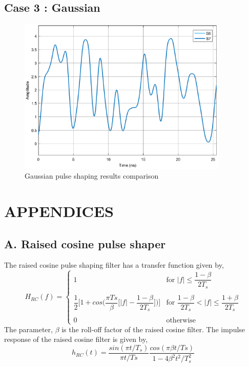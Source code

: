 \begin{refsection}
\subsection*{Case 3 : Gaussian}
\begin{figure}[h]
	\centering
	\includegraphics[width=10cm]{./algorithms/filter/figures/Gaussian_S6S7.eps}
	\caption{Gaussian pulse shaping results comparison}
	\label{S6_S7_gaussian}
\end{figure}



\section*{APPENDICES}
\subsection*{A. Raised cosine pulse shaper}
The raised cosine pulse shaping filter has a transfer function given by,
\begin{equation}
H_{RC}(f) = \begin{cases}
1 &\text{for $|f|\leq \dfrac{1-\beta}{2T_s}$}\\ \\
\dfrac{1}{2} \bigg[1 + cos\bigg(\dfrac{\pi Ts}{\beta}\bigg[|f|- \dfrac{1-\beta}{2T_s} \bigg]\bigg)\bigg] &\text{for $\dfrac{1-\beta}{2T_s}<|f|\leq\dfrac{1+\beta}{2T_s}$}\\ \\
0 & \text{otherwise}
\end{cases}
\end{equation}
The parameter, $\beta$ is the roll-off factor of the raised cosine filter. The impulse response of the raised cosine filter is given by,
\begin{equation}
h_{RC}(t) = \dfrac{sin(\pi t/T_s)}{\pi t/Ts}\dfrac{cos(\pi \beta t/Ts)}{1-4 \beta^2 t^2/T_{s}^2 }
\label{hRC}
\end{equation}

\end{refsection}
